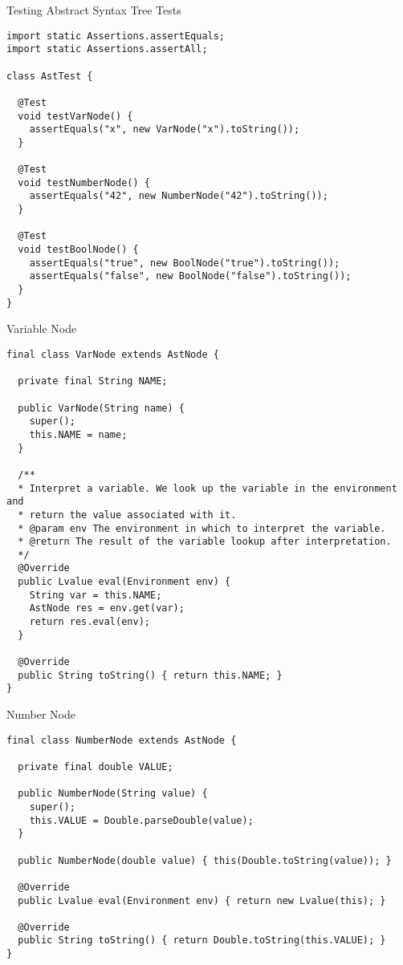 \begin{cl}[]{Testing Abstract Syntax Tree Tests}
\begin{lstlisting}[language=MyJava]
import static Assertions.assertEquals;
import static Assertions.assertAll;

class AstTest {

  @Test
  void testVarNode() {
    assertEquals("x", new VarNode("x").toString());
  }

  @Test
  void testNumberNode() {
    assertEquals("42", new NumberNode("42").toString());
  }

  @Test
  void testBoolNode() {
    assertEquals("true", new BoolNode("true").toString());
    assertEquals("false", new BoolNode("false").toString());
  }  
}
\end{lstlisting}
\end{cl}

\begin{cl}[]{Variable Node}
\begin{lstlisting}[language=MyJava]
final class VarNode extends AstNode {

  private final String NAME;

  public VarNode(String name) {
    super();
    this.NAME = name;
  }

  /**
  * Interpret a variable. We look up the variable in the environment and
  * return the value associated with it.
  * @param env The environment in which to interpret the variable.
  * @return The result of the variable lookup after interpretation.
  */
  @Override
  public Lvalue eval(Environment env) {
    String var = this.NAME;
    AstNode res = env.get(var);
    return res.eval(env);
  }

  @Override
  public String toString() { return this.NAME; }
}
\end{lstlisting}
\end{cl}

\begin{cl}[]{Number Node}
\begin{lstlisting}[language=MyJava]
final class NumberNode extends AstNode {

  private final double VALUE;

  public NumberNode(String value) {
    super();
    this.VALUE = Double.parseDouble(value);
  }

  public NumberNode(double value) { this(Double.toString(value)); }

  @Override
  public Lvalue eval(Environment env) { return new Lvalue(this); }

  @Override
  public String toString() { return Double.toString(this.VALUE); }
}
\end{lstlisting}
\end{cl}

